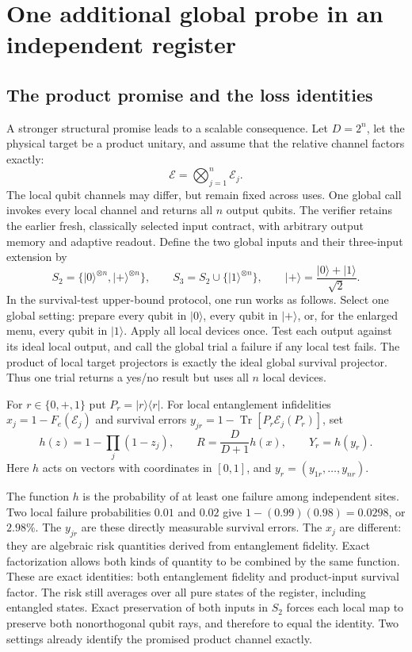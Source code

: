 \documentclass[11pt,a4paper]{article}
\newcommand{\ket}[1]{\lvert #1\rangle}
\newcommand{\bra}[1]{\langle #1\rvert}
\newcommand{\Tr}{\operatorname{Tr}}
\numberwithin{equation}{section}
\begin{document}
\section{One additional global probe in an independent register}

\subsection{The product promise and the loss identities}

A stronger structural promise leads to a scalable consequence. Let $D=2^n$, let the physical target be a product unitary, and assume that the relative channel factors exactly:
\[
 \mathcal E=\bigotimes_{j=1}^n\mathcal E_j.
\]
The local qubit channels may differ, but remain fixed across uses. One global call invokes every local channel and returns all $n$ output qubits. The verifier retains the earlier fresh, classically selected input contract, with arbitrary output memory and adaptive readout. Define the two global inputs and their three-input extension by
\[
 S_2=\{\ket0^{\otimes n},\ket+^{\otimes n}\},
 \qquad S_3=S_2\cup\{\ket1^{\otimes n}\},
 \qquad \ket+=\frac{\ket0+\ket1}{\sqrt2}.
\]
In the survival-test upper-bound protocol, one run works as follows. Select one global setting: prepare every
qubit in $\ket0$, every qubit in $\ket+$, or, for the enlarged menu, every
qubit in $\ket1$. Apply all local devices once. Test each output against
its ideal local output, and call the global trial a failure if any local
test fails. The product of local target projectors is exactly the ideal
global survival projector. Thus one trial returns a yes/no result but uses
all $n$ local devices.

For $r\in\{0,+,1\}$ put $P_r=\ket r\bra r$. For local entanglement infidelities $x_j=1-F_e(\mathcal E_j)$ and survival errors
$y_{jr}=1-\Tr[P_r\mathcal E_j(P_r)]$, set
\[
 h(z)=1-\prod_j(1-z_j),\qquad
 R=\frac D{D+1}h(x),\qquad Y_r=h(y_r).
\]
Here $h$ acts on vectors with coordinates in $[0,1]$, and $y_r=(y_{1r},\ldots,y_{nr})$.

The function $h$ is the probability of at least one failure among
independent sites. Two local failure probabilities $0.01$ and $0.02$ give
$1-(0.99)(0.98)=0.0298$, or $2.98\%$. The $y_{jr}$ are these directly
measurable survival errors. The $x_j$ are different: they are algebraic
risk quantities derived from entanglement fidelity. Exact factorization
allows both kinds of quantity to be combined by the same function. These are exact identities: both entanglement fidelity and product-input survival factor. The risk still averages over all pure states of the register, including entangled states. Exact preservation of both inputs in $S_2$ forces each local map to preserve both nonorthogonal qubit rays, and therefore to equal the identity. Two settings already identify the promised product channel exactly.
\end{document}
